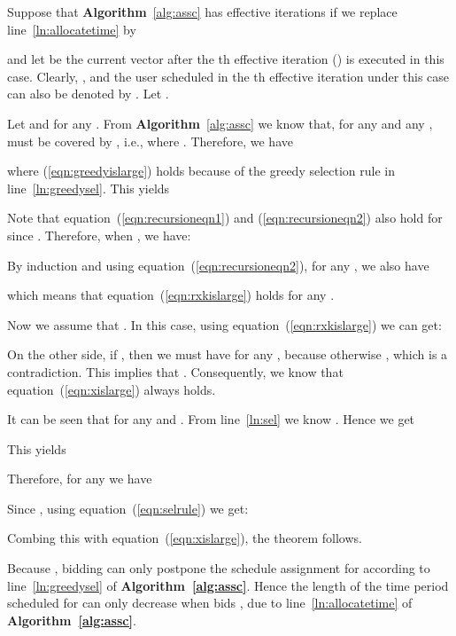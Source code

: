 \documentclass[10pt,journal,compsoc]{IEEEtran}
\begin{document}
\begin{IEEEproof}
Suppose that \textbf{Algorithm}~\ref{alg:assc} has  effective iterations if we replace line~\ref{ln:allocatetime} by

and let  be the current vector  after the th effective iteration () is executed in this case. Clearly, , and the user scheduled in the th effective iteration under this case can also be denoted by . Let .

Let  and  for any . From \textbf{Algorithm}~\ref{alg:assc} we know that, for any  and any ,  must be covered by , i.e.,  where . Therefore, we have

where (\ref{eqn:greedyislarge}) holds because of the greedy selection rule in line~\ref{ln:greedysel}. This yields

Note that equation~(\ref{eqn:recursioneqn1}) and (\ref{eqn:recursioneqn2}) also hold for  since . Therefore, when , we have:

By induction and using equation~(\ref{eqn:recursioneqn2}), for any , we also have

which means that equation~(\ref{eqn:rxkislarge}) holds for any .

Now we assume that . In this case, using equation~(\ref{eqn:rxkislarge}) we can get:


On the other side, if , then we must have  for any , because otherwise , which is a contradiction. This implies that . Consequently, we know that equation~(\ref{eqn:xislarge}) always holds.


It can be seen that  for any  and . From line~\ref{ln:sel} we know . Hence we get

This yields

Therefore, for any  we have

Since , using equation~(\ref{eqn:selrule}) we get:

Combing this with equation~(\ref{eqn:xislarge}), the theorem follows.
\end{IEEEproof}

\begin{IEEEproof} 
Because , bidding  can only postpone the schedule assignment for  according to line~\ref{ln:greedysel} of \textbf{Algorithm~\ref{alg:assc}}. Hence the length of the time period scheduled for  can only decrease when  bids , due to line~\ref{ln:allocatetime} of \textbf{Algorithm~\ref{alg:assc}}.
\end{IEEEproof}
\end{document}
